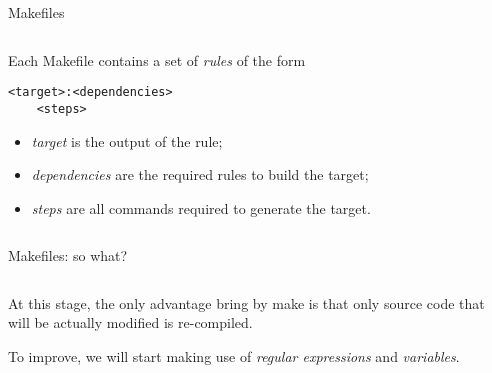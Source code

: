 \begin{frame}[fragile]{Makefiles}
    \begin{columns}[c]
      \begin{column}{0.48\textwidth}
          Each Makefile contains a set of \emph{rules} of the form
        \begin{lstlisting}
<target>:<dependencies>
    <steps>\end{lstlisting}
        \begin{itemize}
            \item \emph{target} is the output of the rule;
            \item \emph{dependencies} are the required rules to build the target;
            \item \emph{steps} are all commands required to generate the target.
        \end{itemize}
      \end{column}
      \begin{column}{0.48\textwidth}
          
      \end{column}
    \end{columns}
\end{frame}

\begin{frame}[fragile]{Makefiles: so what?}
    \begin{columns}[c]
      \begin{column}{0.48\textwidth}
          At this stage, the only advantage bring by make is that only source code that will be actually modified is re-compiled. \vspace{3mm}

          To improve, we will start making use of \emph{regular expressions} and \emph{variables}.
      \end{column}
      \begin{column}{0.48\textwidth}
          
      \end{column}
    \end{columns}
\end{frame}

